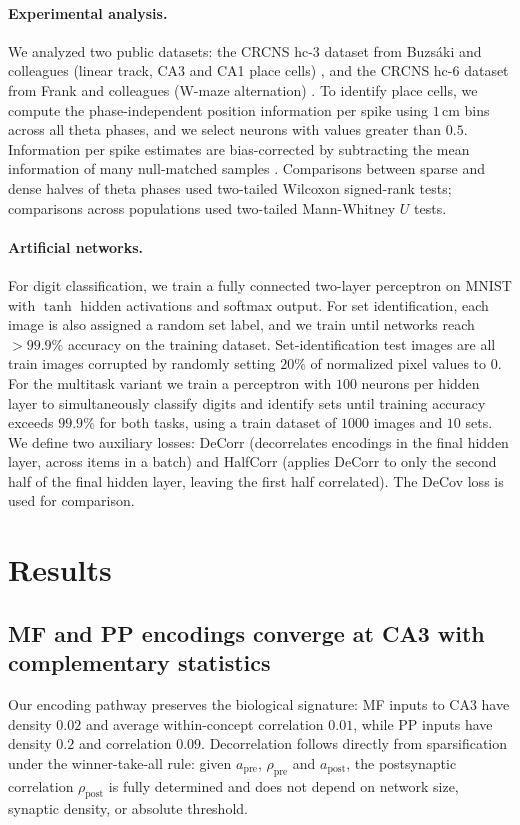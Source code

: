 \documentclass[11pt]{article}
\begin{document}
\paragraph{Experimental analysis.} We analyzed two public datasets: the CRCNS hc-3 dataset from Buzs\'aki and colleagues (linear track, CA3 and CA1 place cells) \cite{mizuseki2013crcns,skaggs1996}, and the CRCNS hc-6 dataset from Frank and colleagues (W-maze alternation) \cite{karlsson2015,frank2000,wood2000}. To identify place cells, we compute the phase-independent position information per spike using $1$\,cm bins across all theta phases, and we select neurons with values greater than $0.5$. Information per spike estimates are bias-corrected by subtracting the mean information of many null-matched samples \cite{dotson2021yartsev}. Comparisons between sparse and dense halves of theta phases used two-tailed Wilcoxon signed-rank tests; comparisons across populations used two-tailed Mann-Whitney $U$ tests.

\paragraph{Artificial networks.} For digit classification, we train a fully connected two-layer perceptron on MNIST \cite{lecun1998mnist} with $\tanh$ hidden activations and softmax output. For set identification, each image is also assigned a random set label, and we train until networks reach $>99.9\%$ accuracy on the training dataset. Set-identification test images are all train images corrupted by randomly setting $20\%$ of normalized pixel values to $0$. For the multitask variant we train a perceptron with $100$ neurons per hidden layer to simultaneously classify digits and identify sets until training accuracy exceeds $99.9\%$ for both tasks, using a train dataset of $1000$ images and $10$ sets. We define two auxiliary losses: DeCorr (decorrelates encodings in the final hidden layer, across items in a batch) and HalfCorr (applies DeCorr to only the second half of the final hidden layer, leaving the first half correlated). The DeCov loss \cite{cogswell2015decov} is used for comparison.

\section{Results}

\subsection{MF and PP encodings converge at CA3 with complementary statistics}
Our encoding pathway preserves the biological signature: MF inputs to CA3 have density $0.02$ and average within-concept correlation $0.01$, while PP inputs have density $0.2$ and correlation $0.09$. Decorrelation follows directly from sparsification under the winner-take-all rule: given $a_{\mathrm{pre}}$, $\rho_{\mathrm{pre}}$ and $a_{\mathrm{post}}$, the postsynaptic correlation $\rho_{\mathrm{post}}$ is fully determined and does not depend on network size, synaptic density, or absolute threshold.
\end{document}
